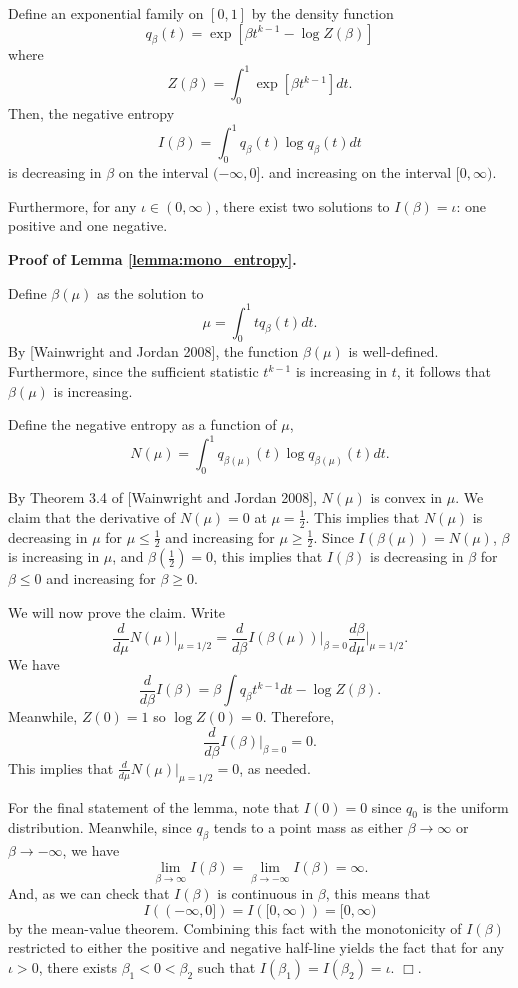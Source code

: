 \documentclass[12pt]{article}
\begin{document}
\begin{lemma}\label{lemma:mono_entropy}
Define an exponential family on $[0,1]$ by the density function
\[
q_\beta(t) = \exp[\beta t^{k-1} - \log Z(\beta)]
\]
where
\[
Z(\beta) = \int_0^1 \exp[\beta t^{k-1}] dt.
\]
Then, the negative entropy
\[
I(\beta) = \int_0^1 q_\beta(t) \log q_\beta(t) dt
\]
is decreasing in $\beta$ on the interval $(-\infty, 0]$.
and increasing on the interval $[0, \infty)$.

Furthermore, for any $\iota \in (0,\infty)$, there exist two solutions
to $I(\beta) = \iota$: one positive and one negative.
\end{lemma}

\textbf{Proof of Lemma \ref{lemma:mono_entropy}.}

Define $\beta(\mu)$ as the solution to
\[
\mu = \int_0^1 t q_\beta(t) dt.
\]
By [Wainwright and Jordan 2008], the function $\beta(\mu)$ is
well-defined.  Furthermore, since the sufficient statistic $t^{k-1}$
is increasing in $t$, it follows that $\beta(\mu)$ is increasing.

Define the negative entropy as a function of $\mu$,
\[
N(\mu) = \int_0^1 q_{\beta(\mu)}(t) \log q_{\beta(\mu)}(t) dt.
\]

By Theorem 3.4 of [Wainwright and Jordan 2008], $N(\mu)$ is convex in
$\mu$.  We claim that the derivative of $N(\mu) = 0$ at $\mu
= \frac{1}{2}$.  This implies that $N(\mu)$ is decreasing in $\mu$ for
$\mu \leq \frac{1}{2}$ and increasing for $\mu \geq \frac{1}{2}$.
Since $I(\beta(\mu)) = N(\mu)$, $\beta$ is increasing in $\mu$, and
$\beta(\frac{1}{2}) = 0$, this implies that $I(\beta)$ is decreasing
in $\beta$ for $\beta \leq 0$ and increasing for $\beta \geq 0$.

We will now prove the claim.  Write
\[
\frac{d}{d\mu} N(\mu)\bigg|_{\mu = 1/2} = \frac{d}{d\beta} I(\beta(\mu)) \bigg|_{\beta = 0} \frac{d\beta}{d\mu} \bigg|_{\mu = 1/2}.
\]
We have
\[
\frac{d}{d\beta} I(\beta) = \beta \int q_\beta t^{k-1} dt - \log Z(\beta).
\]
Meanwhile, $Z(0) = 1$ so $\log Z(0) = 0$.  Therefore,
\[
\frac{d}{d\beta} I(\beta) \bigg|_{\beta = 0} = 0.
\]
This implies that $\frac{d}{d\mu} N(\mu) |_{\mu = 1/2} = 0$, as needed.  

For the final statement of the lemma, note that $I(0) = 0$ since $q_0$ is the uniform distribution.
Meanwhile, since $q_\beta$ tends to a point mass as either $\beta \to \infty$ or $\beta \to -\infty$,
we have 
\[
\lim_{\beta \to \infty} I(\beta) = \lim_{\beta \to -\infty} I(\beta) = \infty.
\]
And, as we can check that $I(\beta)$ is continuous in $\beta$, this means that
\[
I((-\infty, 0]) = I([0,\infty)) = [0, \infty)
\]
by the mean-value theorem.  Combining this fact with the monotonicity
of $I(\beta)$ restricted to either the positive and negative half-line
yields the fact that for any $\iota > 0$, there exists $\beta_1 < 0
< \beta_2$ such that $I(\beta_1) = I(\beta_2) = \iota$.  $\Box$.
\end{document}
